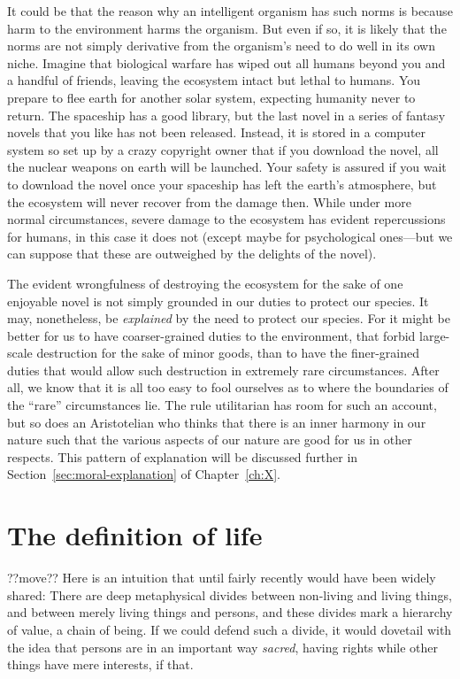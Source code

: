 It could be that the reason why an intelligent organism has such norms is because harm to the environment harms the organism.
But even if so, it is likely that the norms are not simply derivative from the organism's need to do well in its own 
niche. Imagine that biological warfare has wiped out all humans beyond you and a handful of friends, leaving the ecosystem 
intact but lethal to humans. You prepare to flee earth for another solar system, expecting humanity never to return. 
The spaceship has a good library, but the last novel in a series of fantasy novels that you like has not been released.
Instead, it is stored in a computer system so set up by a crazy copyright owner that if you download the novel, all the 
nuclear weapons on earth will be launched. Your safety is assured if you wait to download the novel once your spaceship has 
left the earth's atmosphere, but the ecosystem will never recover from the damage then. While under more normal circumstances,
severe damage to the ecosystem has evident repercussions for humans, in this case it does not (except maybe for psychological
ones---but we can suppose that these are outweighed by the delights of the novel). 

The evident wrongfulness of destroying the ecosystem for the sake of one enjoyable novel is not simply grounded in our duties to 
protect our species. It may, nonetheless, be \textit{explained} by the need to protect our species. For it might be better for 
us to have coarser-grained duties to the environment, that forbid large-scale destruction for the sake of minor goods, than to 
have the finer-grained duties that would allow such destruction in extremely rare circumstances. After all, we know that it is 
all too easy to fool ourselves as to where the boundaries of the ``rare'' circumstances lie. The rule utilitarian has room for 
such an account, but so does an Aristotelian who thinks that there is an inner harmony in our nature such that the various 
aspects of our nature are good for us in other respects. This pattern of explanation will be discussed further in Section~\ref{sec:moral-explanation}
of Chapter~\ref{ch:X}.

\section{The definition of life}??move??
Here is an intuition that until fairly recently would have been widely shared: There are deep metaphysical divides between non-living and living things,
and between merely living things and persons, and these divides mark a hierarchy of value, a chain of being. If we could defend such a divide, it would
dovetail with the idea that persons are in an important way \textit{sacred}, having rights while other things have mere interests, if that.

